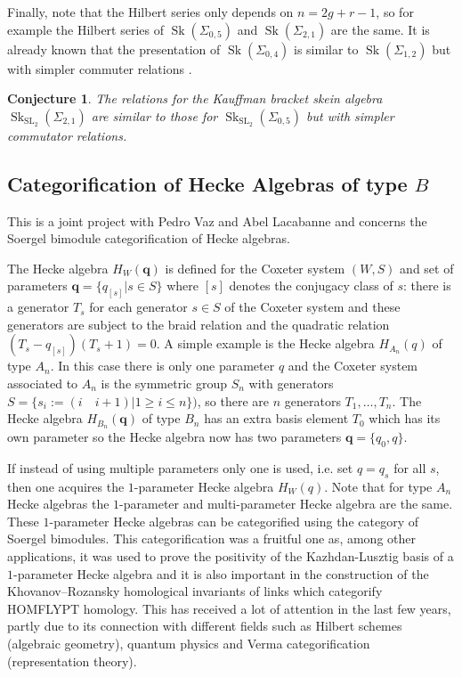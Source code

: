 \documentclass{article}
\newcommand{\Sk}{\operatorname{Sk}}
\newcommand{\SL}{\operatorname{SL}}
\newtheorem{conj}[thm]{Conjecture}
\begin{document}
Finally, note that the Hilbert series only depends on $n=2g + r - 1$, so for example the Hilbert series of $\Sk(\Sigma_{0,5})$ and $\Sk(\Sigma_{2,1})$ are the same. It is already known that the presentation of $\Sk(\Sigma_{0,4})$ is similar to $\Sk(\Sigma_{1,2})$ but with simpler commuter relations \cite{BullockPrzytycki00}. 
\begin{conj}
The relations for the Kauffman bracket skein algebra $\Sk_{\SL_2}(\Sigma_{2,1})$ are similar to those for $\Sk_{\SL_2}(\Sigma_{0,5})$  but with simpler commutator relations.
\end{conj}

\subsection{Categorification of Hecke Algebras of type $B$}
\label{sec:heckeBcat}

This is a joint project with Pedro Vaz and Abel Lacabanne and concerns the Soergel bimodule categorification of Hecke algebras.

The Hecke algebra $H_W(\mathbf{q})$ is defined for the Coxeter system $(W, S)$ and set of parameters $\mathbf{q} = \{q_{[s]} | s \in S\}$ where $[s]$ denotes the conjugacy class of $s$: there is a generator $T_s$ for each generator $s \in S$ of the Coxeter system and these generators are subject to the braid relation and the quadratic relation $(T_s-q_{[s]})(T_s +1) = 0$. 
A simple example is the Hecke algebra  $H_{A_n}(q)$ of type $A_n$. In this case there is only one parameter $q$ and the Coxeter system associated to $A_n$ is the symmetric group $S_n$ with generators $S = \{s_i := (i \quad i+1 )| 1 \geq i \leq n\})$, so there are $n$ generators $T_1, \dots, T_n$. The Hecke algebra $H_{B_n}(\mathbf{q})$ of type $ B_n $ has an extra basis element $T_0$ which has its own parameter so the Hecke algebra now has two parameters $\mathbf{q} = \{q_0, q\}$.

If instead of using multiple parameters only one is used, i.e. set $q=q_s$ for all $s$, then one acquires the $1$-parameter Hecke algebra $H_W(q)$. Note that for type $A_n$ Hecke algebras the $1$-parameter and multi-parameter Hecke algebra are the same.
These $1$-parameter Hecke algebras can be categorified using the category of Soergel bimodules. This categorification was a fruitful one as, among other applications, it was used to prove the positivity of the Kazhdan-Lusztig basis of a $1$-parameter Hecke algebra and it is also important in the construction of the Khovanov--Rozansky homological invariants of links which categorify HOMFLYPT homology. This  has received a lot of attention in the last few years, partly due to its connection with different fields such as Hilbert schemes (algebraic geometry), quantum physics and Verma categorification (representation theory).
\end{document}
